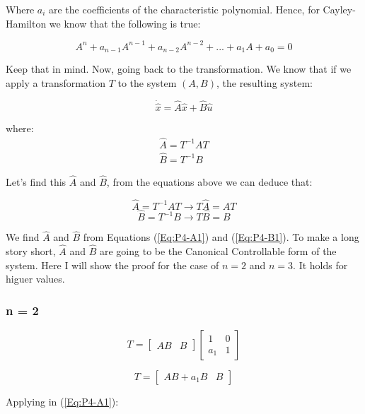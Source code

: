 \documentclass[10pt,a4paper]{article}
\begin{document}
Where $a_{i}$ are the coefficients of the characteristic polynomial. Hence, for Cayley-Hamilton we know that the following is true:

\[ A^{n} + a_{n-1}A^{n-1} + a_{n-2}A^{n-2} + ... + a_{1}A + a_{0} = 0 \]  
\begin{center}
\end{center}

Keep that in mind. Now, going back to the transformation. We know that if we apply a transformation $T$ to the system $(A,B)$, the resulting system:

\[ \dot{\hat{x}} = \hat{A}\hat{x} + \hat{B}\hat{u} \]

where: 
\[ \begin{matrix}
\hat{A} = T^{-1}AT \\
\hat{B} = T^{-1}B
\end{matrix} \]

Let's find this $\hat{A}$ and $\hat{B}$, from the equations above we can deduce that:

\begin{equation} 
\hat{A} = T^{-1}AT \rightarrow T\hat{A} = AT 
\label{Eq:P4-A1}
\end{equation}
\begin{equation}
\hat{B} = T^{-1}B \rightarrow T\hat{B} = B
\label{Eq:P4-B1}
\end{equation}

We find $\hat{A}$ and $\hat{B}$ from Equations (\ref{Eq:P4-A1}) and (\ref{Eq:P4-B1}). To make a long story short, $\hat{A}$ and $\hat{B}$ are going to be the Canonical Controllable form of the system. Here I will show the proof for the case of $n = 2$ and $n = 3$. It holds for higuer values.

\subsubsection*{n = 2}

\[
T = 
\begin{bmatrix}
AB & B
\end{bmatrix}
\begin{bmatrix}
1 & 0 \\
a_{1} & 1
\end{bmatrix}
\]

\[
T = 
\begin{bmatrix}
AB + a_{1}B & B 
\end{bmatrix}
\]

Applying in (\ref{Eq:P4-A1}):
\end{document}
